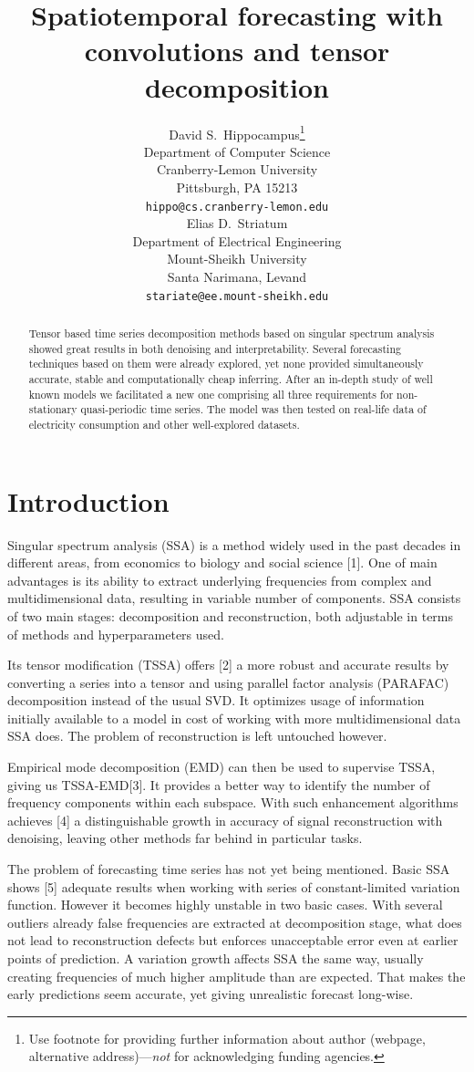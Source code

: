 \documentclass{article}
\title{Spatiotemporal forecasting with convolutions and tensor decomposition}
\author{ David S.~Hippocampus\thanks{Use footnote for providing further
		information about author (webpage, alternative
		address)---\emph{not} for acknowledging funding agencies.} \\
	Department of Computer Science\\
	Cranberry-Lemon University\\
	Pittsburgh, PA 15213 \\
	\texttt{hippo@cs.cranberry-lemon.edu} \\
	\And
	Elias D.~Striatum \\
	Department of Electrical Engineering\\
	Mount-Sheikh University\\
	Santa Narimana, Levand \\
	\texttt{stariate@ee.mount-sheikh.edu} \\
}
\date{}
\begin{document}
\maketitle

\begin{abstract}
Tensor based time series decomposition methods based on singular spectrum analysis showed great results in both denoising and interpretability. Several forecasting techniques based on them were already explored, yet none provided simultaneously accurate, stable and computationally cheap inferring. After an in-depth study of well known models we facilitated a new one comprising all three requirements for non-stationary quasi-periodic time series. The model was then tested on real-life data of electricity consumption and other well-explored datasets. 
\end{abstract}



\section{Introduction}
Singular spectrum analysis (SSA) is a method widely used in the past decades in different areas, from economics to biology and social science [1].  One of main advantages is its ability to extract underlying frequencies from complex and multidimensional data, resulting in  variable number of components. SSA consists of two main stages: decomposition and reconstruction, both adjustable in terms of methods and hyperparameters used.

Its tensor modification (TSSA) offers [2] a more robust and accurate results by converting a series into a tensor and using  parallel factor analysis (PARAFAC) decomposition instead of the usual SVD. It optimizes usage of information initially available to a model in cost of working with more multidimensional data SSA does. The problem of reconstruction is left untouched however.

Empirical mode decomposition (EMD) can then be used  to supervise TSSA, giving us TSSA-EMD[3]. It provides a better way to identify the number of frequency components within each subspace. With such enhancement algorithms achieves [4] a distinguishable growth in accuracy of signal reconstruction with denoising, leaving other methods far behind in particular tasks.

The problem of forecasting time series has not yet being mentioned. Basic SSA shows [5] adequate results when working with series of constant-limited variation function. However it becomes highly unstable in two basic cases. With several outliers already false frequencies are extracted at decomposition stage, what does not lead to reconstruction defects but enforces unacceptable error even at earlier points of prediction. A variation growth affects SSA the same way, usually creating frequencies of much higher amplitude than are expected. That makes the early predictions seem accurate, yet giving unrealistic forecast long-wise.
\end{document}

